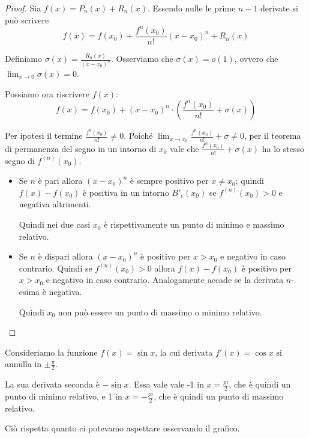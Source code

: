 \begin{proof}
Sia $f(x) = P_n(x) + R_n(x)$. Essendo nulle le prime $n-1$ derivate si può scrivere
\begin{equation*}
f(x) = f(x_0) + \frac{f^n(x_0)}{n!} (x-x_0)^n + R_n(x)
\end{equation*}

Definiamo $\sigma(x) = \frac{R_n(x)}{(x-x_0)^n}$. Osserviamo che $\sigma(x) = o(1)$, ovvero che $\lim_{x \to 0} \sigma (x) = 0$.

Possiamo ora riscrivere $f(x)$:
\begin{equation*}
f(x) = f(x_0) + (x-x_0)^n \cdot \left(\frac{f^n(x_0)}{n!} +\sigma(x) \right)
\end{equation*}

Per ipotesi il termine $\frac{f^n(x_0)}{n!} \neq 0$. Poiché $\lim_{x \to x_0} \frac{f^n(x_0)}{n!} + \sigma \neq 0$, per il teorema di permanenza del segno in un intorno di $x_0$ vale che $\frac{f^n(x_0)}{n!} + \sigma(x)$ ha lo stesso segno di $f^{(n)} (x_0)$.

\begin{itemize}
\item Se $n$ è pari allora $(x-x_0)^n$ è sempre positivo per $x \neq x_0$; quindi $f(x)-f(x_0)$ è positiva in un intorno $B'_\epsilon(x_0)$ se $f^{(n)} (x_0) > 0$ e negativa altrimenti.

Quindi nei due casi $x_0$ è rispettivamente un punto di minimo e massimo relativo.

\item Se $n$ è dispari allora $(x-x_0)^n$ è positivo per $x>x_0$ e negativo in caso contrario. Quindi se $f^{(n)} (x_0) > 0$ allora $f(x)-f(x_0)$ è positivo per $x > x_0$ e negativo in caso contrario. Analogamente accade se la derivata $n$-esima è negativa.

Quindi $x_0$ non può essere un punto di massimo o minimo relativo.
\end{itemize}
\end{proof}

\begin{example}
Consideriamo la funzione $f(x) = \sin x$, la cui derivata $f'(x) = \cos x$ si annulla in $\pm \frac{\pi}{2}$.

La sua derivata seconda è $-\sin x$. Essa vale vale -1 in $x = \frac{pi}{2}$, che è quindi un punto di minimo relativo, e 1 in $x = -\frac{pi}{2}$, che è quindi un punto di massimo relativo. 

Ciò rispetta quanto ci potevamo aspettare osservando il grafico.
\end{example}